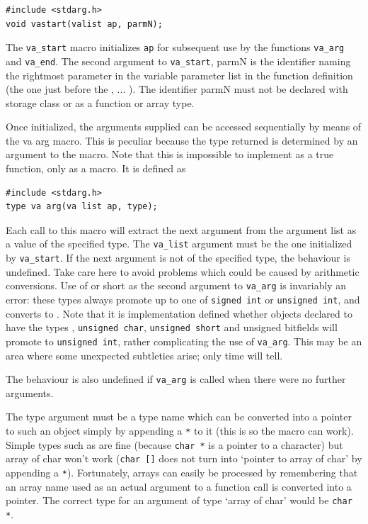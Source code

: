   \begin{Verbatim}
#include <stdarg.h>
void vastart(valist ap, parmN);
\end{Verbatim}

  The \texttt{va\_start} macro initializes \texttt{ap} for subsequent
   use by  the functions   \texttt{va\_arg}  and  \texttt{va\_end}.   The
   second  argument  to \texttt{va\_start}, parmN  is  the
   identifier  naming  the  rightmost parameter  in  the  variable  parameter
   list in the function definition (the one just before the , ... ).  The
   identifier parmN must not be declared with \register{}
   storage class or as a function or array type.


  Once initialized, the arguments  supplied  can  be  accessed sequentially
   by means of the va arg macro. This is peculiar because the type returned is
   determined by  an  argument  to the  macro.  Note  that this is impossible
   to implement as a true function, only as a macro. It is defined as


  \begin{Verbatim}
#include <stdarg.h>
type va arg(va list ap, type);
\end{Verbatim}

  Each call to this macro will extract the next argument  from the  argument
   list  as  a value of the specified type.  The \texttt{va\_list} argument
   must be the one  initialized  by  \texttt{va\_start}.  If  the  next
   argument  is  not  of the specified type, the behaviour is undefined.  Take
   care here  to  avoid  problems which  could  be  caused  by arithmetic
   conversions.  Use of \kchar{} or short as the second argument to
   \texttt{va\_arg} is invariably an error: these types always promote up to
   one of \texttt{signed int} or \texttt{unsigned int}, and
   \float{} converts to \double.  Note that it is
   implementation  defined whether objects declared to have the types
   \kchar, \texttt{unsigned char}, \texttt{unsigned short}
   and  unsigned bitfields  will promote to \texttt{unsigned int}, rather
   complicating the  use  of  \texttt{va\_arg}.   This  may  be  an  area
   where  some unexpected subtleties arise; only time will tell.


  The behaviour is also undefined if  \texttt{va\_arg}  is  called  when
   there were no further arguments.


  The type argument must be a type name which can be converted
   into  a pointer to such an object simply by appending a \texttt{*} to it
   (this is so the macro can work).  Simple  types  such  as \kchar
   are  fine (because \texttt{char *} is a pointer to a character) but
   array of char won't work (\texttt{char []}  does  not  turn  into
   `pointer  to array of char' by appending a \texttt{*}).
   Fortunately, arrays can easily be processed by remembering that an  array
   name  used  as  an  actual  argument  to  a function call is converted into
   a pointer.  The correct type for an  argument of type `array
   of char' would be \texttt{char *}.


